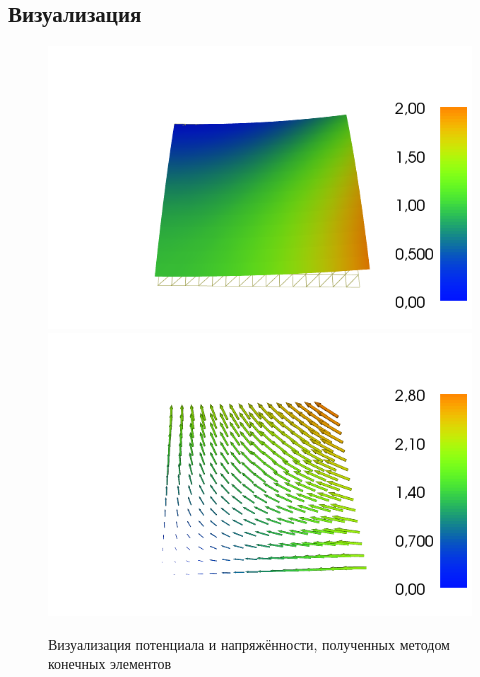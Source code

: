 \documentclass{report}
\begin{document}
\subsection{Визуализация}
\begin{figure}[h]
	\includegraphics[scale=0.4]{dolfin_plot_5.png}
	\includegraphics[scale=0.4]{dolfin_plot_4.png}
	\caption{Визуализация потенциала и напряжённости, полученных методом конечных элементов}
	\centering
\end{figure}
\end{document}
